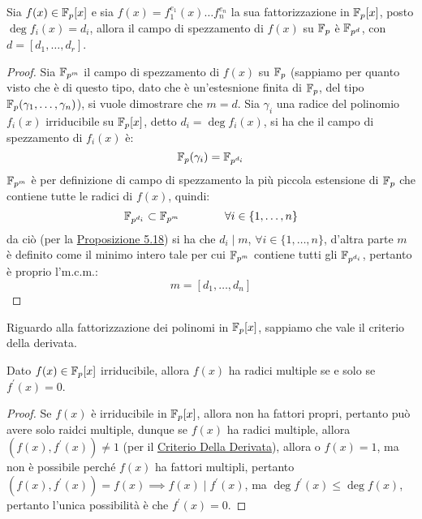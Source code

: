 \documentclass[11pt]{scrartcl}
\begin{document}
\begin{theorem}
	Sia $f(x) \in {\mathbb F}_p[x]$ e sia $f(x)=f_1^{e_1}(x)\ldots f_n^{e_n}$ la sua fattorizzazione in ${\mathbb F}_p[x]$, posto
	$\deg f_i(x) = d_i$, allora il campo di spezzamento di $f(x)$ su ${\mathbb F}_p$ è $\mathbb F_{p^d}$, con $d=[d_1,\ldots,d_r]$.
\end{theorem}

\begin{proof}
Sia $\mathbb{F}_{{p}^{m}}$ il campo di spezzamento di $f(x)$ su ${\mathbb F}_p$ (sappiamo per quanto visto che è di questo tipo, dato che 
è un'estesnione finita di ${\mathbb F}_p$, del tipo ${\mathbb F}_p(\gamma_1,\ldots,\gamma_n)$), si vuole dimostrare che $m=d$. Sia $\gamma_i$ una
radice del polinomio $f_i(x)$ irriducibile su ${\mathbb F}_p[x]$, detto $d_i = \deg f_i(x)$, si ha che il campo di spezzamento di $f_i(x)$ è:
	\[ {\mathbb F}_p(\gamma_i) = \mathbb{F}_{{p}^{d_i}}
		\]
$\mathbb{F}_{{p}^{m}}$ è per definizione di campo di spezzamento la più piccola estensione di ${\mathbb F}_p$ che contiene tutte le radici di $f(x)$, quindi:
	\[ \mathbb{F}_{{p}^{d_i}} \subset \mathbb{F}_{{p}^{m}}
	\qquad\qquad\forall i \in \{1,\ldots,n\}
		\]
	da ciò (per la \hyperref[cf:5.18]{Proposizione 5.18}) si ha che $d_i \mid m$, $\forall i \in \{1,\ldots,n\}$, d'altra parte $m$ è definito
	come il minimo intero tale per cui $\mathbb{F}_{{p}^{m}}$ contiene tutti gli $\mathbb{F}_{{p}^{d_i}}$, pertanto è proprio l'm.c.m.:
		\[ m = [d_1,\ldots,d_n]
			\]
\end{proof}

\begin{remark}
	Riguardo alla fattorizzazione dei polinomi in ${\mathbb F}_p[x]$, sappiamo che vale il criterio della derivata.
\end{remark}

\begin{corollary}
	Dato $f(x) \in {\mathbb F}_p[x]$ irriducibile, allora $f(x)$ ha radici multiple se e solo se $f^{\prime}(x) = 0$.
\end{corollary}

\begin{proof}
	Se $f(x)$ è irriducibile in ${\mathbb F}_p[x]$, allora non ha fattori propri, pertanto può avere solo raidci multiple, dunque se $f(x)$ ha radici multiple,
	allora $(f(x),f^{\prime}(x)) \ne 1$ (per il \hyperref[p:der]{Criterio Della Derivata}), allora o $f(x) = 1$, ma non è possibile perché $f(x)$ ha fattori multipli,
	pertanto $(f(x),f^{\prime}(x)) = f(x) \implies f(x) \mid f^{\prime}(x)$, ma $\deg f^{\prime}(x) \leq \deg f(x)$, pertanto l'unica possibilità è che $f^{\prime}(x)=0$.
\end{proof}
\end{document}
